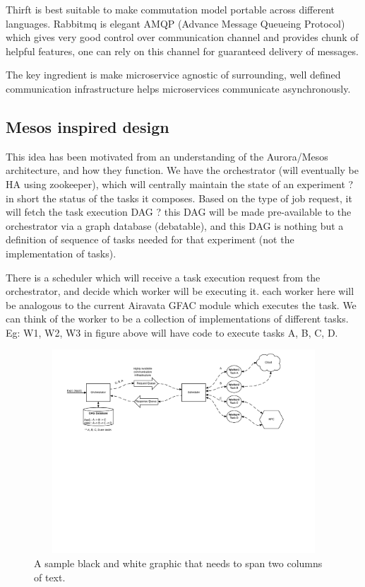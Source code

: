 \documentclass[sigconf]{acmart}
\begin{document}
Thirft is best suitable to make commutation model portable across different languages. Rabbitmq is elegant AMQP (Advance Message Queueing Protocol) which gives very good control over communication channel and provides chunk of helpful features, one can rely on this channel for guaranteed delivery of messages.

The key ingredient is make microservice agnostic of surrounding, well defined communication infrastructure helps microservices communicate asynchronously.

\subsection{Mesos inspired design}

This idea has been motivated from an understanding of the Aurora/Mesos architecture, and how they function. We have the orchestrator (will eventually be HA using zookeeper), which will centrally maintain the state of an experiment ? in short the status of the tasks it composes. Based on the type of job request, it will fetch the task execution DAG ? this DAG will be made pre-available to the orchestrator via a graph database (debatable), and this DAG is nothing but a definition of sequence of tasks needed for that experiment (not the implementation of tasks).

There is a scheduler which will receive a task execution request from the orchestrator, and decide which worker will be executing it. each worker here will be analogous to the current Airavata \cite{airavata} GFAC module which executes the task. We can think of the worker to be a collection of implementations of different tasks. Eg: W1, W2, W3 in figure above will have code to execute tasks A, B, C, D.

\begin{figure}
\includegraphics[height=3in, width=7in]{figures/overall-design.pdf}
\caption{A sample black and white graphic
that needs to span two columns of text.}
\end{figure}
\end{document}
